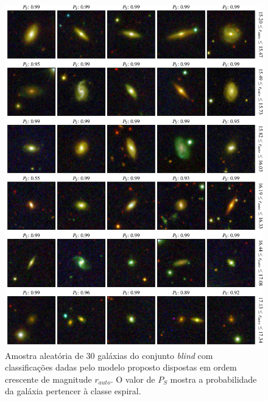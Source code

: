 \begin{figure}[!ht]
  \centering
  \includegraphics[width=0.95\linewidth]{figures/blind_preds_spir_2.pdf}
  \caption{Amostra aleatória de 30 galáxias do conjunto \emph{blind} com classificações dadas pelo modelo proposto dispostas em ordem crescente de magnitude $r_{auto}$. O valor de $P_S$ mostra a probabilidade da galáxia pertencer à classe espiral.}
  \label{fig:grid-s2}
\end{figure}

